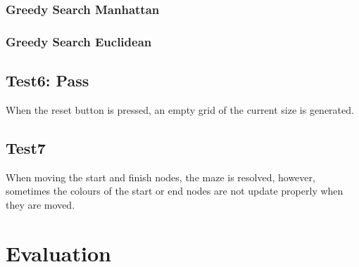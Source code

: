 \documentclass{article}
\begin{document}
\subsubsection{Greedy Search Manhattan}

\subsubsection{Greedy Search Euclidean}

\subsection{Test6: Pass}
When the reset button is pressed, an empty grid of the current size is generated.
\subsection{Test7}
When moving the start and finish nodes, the maze is resolved, however, sometimes the colours of the start or end nodes are not update properly when they are moved.

\section{Evaluation}
\end{document}
